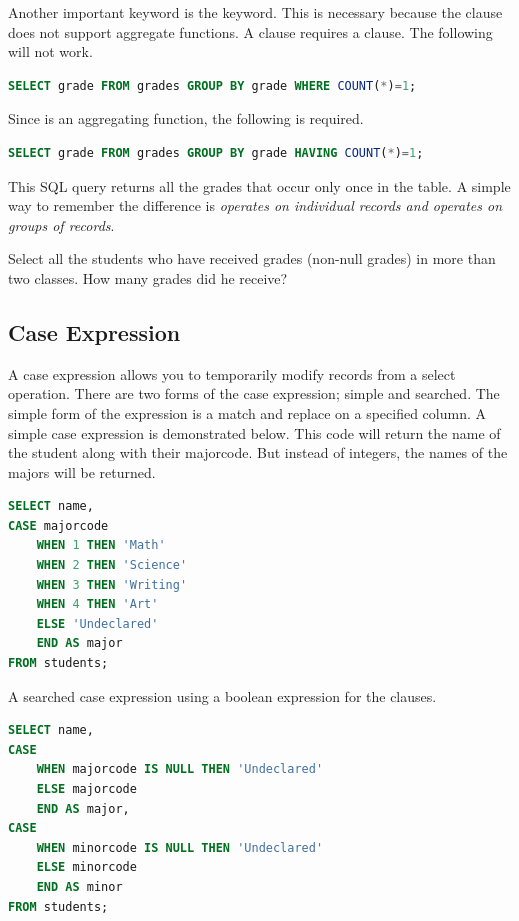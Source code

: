 Another important keyword is the  keyword.
This is necessary because the  clause does not support aggregate functions.
A  clause requires a  clause.
The following will not work.
\begin{lstlisting}[language=SQL]
SELECT grade FROM grades GROUP BY grade WHERE COUNT(*)=1;
\end{lstlisting}
Since  is an aggregating function, the following is required.
\begin{lstlisting}[language=SQL]
SELECT grade FROM grades GROUP BY grade HAVING COUNT(*)=1;
\end{lstlisting}
This SQL query returns all the grades that occur only once in the table.
A simple way to remember the difference is \emph{ operates on individual records and  operates on groups of records}.

\begin{problem}
Select all the students who have received grades (non-null grades) in more than two classes.  How many grades did he receive?
\label{prob:manygrades}
\end{problem}

\subsection*{Case Expression}
A case expression allows you to temporarily modify records from a select operation.
There are two forms of the case expression; simple and searched.
The simple form of the expression is a match and replace on a specified column.
A simple case expression is demonstrated below.
This code will return the name of the student along with their majorcode.
But instead of integers, the names of the majors will be returned.
\begin{lstlisting}[language=SQL]
SELECT name,
CASE majorcode
    WHEN 1 THEN 'Math'
    WHEN 2 THEN 'Science'
    WHEN 3 THEN 'Writing'
    WHEN 4 THEN 'Art'
    ELSE 'Undeclared'
    END AS major
FROM students;
\end{lstlisting}

A searched case expression using a boolean expression for the  clauses.
\begin{lstlisting}[language=SQL]
SELECT name,
CASE
    WHEN majorcode IS NULL THEN 'Undeclared'
    ELSE majorcode
    END AS major,
CASE
    WHEN minorcode IS NULL THEN 'Undeclared'
    ELSE minorcode
    END AS minor
FROM students;
\end{lstlisting}

